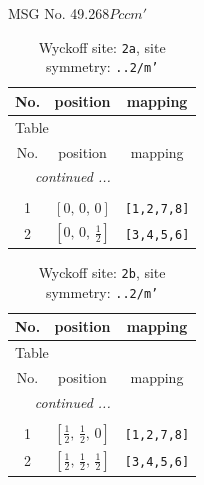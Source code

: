 \documentclass[fleqn,8pt]{jsarticle}
\begin{document}
\setcounter{MaxMatrixCols}{32}

\renewcommand{\tablename}{Table~}
\renewcommand{\figurename}{Figure~}
\begin{center}
\LARGE
MSG No. 49.268\quad$Pccm'$
\end{center}
\renewcommand{\arraystretch}{1.2}
\begin{longtable}{ccc}
\caption{Wyckoff site: {\tt 2a}, site symmetry: {\tt ..2/m'}}
 \\
 \hline \hline
No. & position & mapping \\ \hline \endfirsthead

\multicolumn{2}{l}{\tablename\ \thetable{}} \\
 \hline \hline
No. & position & mapping \\ \hline \endhead

 \hline \hline
\multicolumn{2}{r}{\footnotesize\it continued ...} \\ \endfoot

 \hline \hline
\multicolumn{2}{r}{} \\ \endlastfoot

1 & $\left[ 0,\, 0,\, 0 \right]$ & {\tt [1,2,7,8]} \\ \hline
2 & $\left[ 0,\, 0,\, \frac{1}{2} \right]$ & {\tt [3,4,5,6]} \\
\end{longtable}
\renewcommand{\arraystretch}{1.2}
\begin{longtable}{ccc}
\caption{Wyckoff site: {\tt 2b}, site symmetry: {\tt ..2/m'}}
 \\
 \hline \hline
No. & position & mapping \\ \hline \endfirsthead

\multicolumn{2}{l}{\tablename\ \thetable{}} \\
 \hline \hline
No. & position & mapping \\ \hline \endhead

 \hline \hline
\multicolumn{2}{r}{\footnotesize\it continued ...} \\ \endfoot

 \hline \hline
\multicolumn{2}{r}{} \\ \endlastfoot

1 & $\left[ \frac{1}{2},\, \frac{1}{2},\, 0 \right]$ & {\tt [1,2,7,8]} \\ \hline
2 & $\left[ \frac{1}{2},\, \frac{1}{2},\, \frac{1}{2} \right]$ & {\tt [3,4,5,6]} \\
\end{longtable}
\end{document}

